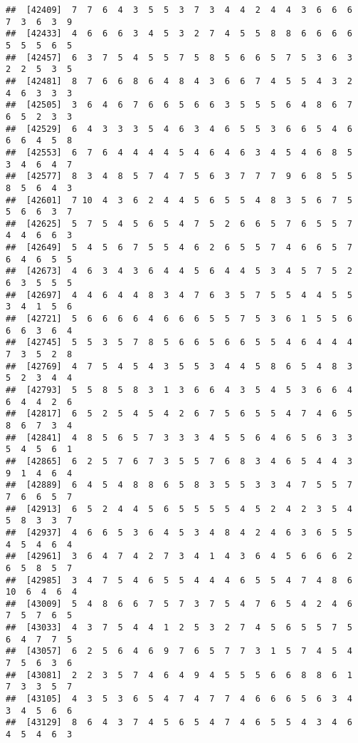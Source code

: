 \documentclass[
]{book}
\begin{document}
\begin{verbatim}
##  [42409]  7  7  6  4  3  5  5  3  7  3  4  4  2  4  4  3  6  6  6  7  3  6  3  9
##  [42433]  4  6  6  6  3  4  5  3  2  7  4  5  5  8  8  6  6  6  6  5  5  5  6  5
##  [42457]  6  3  7  5  4  5  5  7  5  8  5  6  6  5  7  5  3  6  3  2  2  5  3  5
##  [42481]  8  7  6  6  8  6  4  8  4  3  6  6  7  4  5  5  4  3  2  4  6  3  3  3
##  [42505]  3  6  4  6  7  6  6  5  6  6  3  5  5  5  6  4  8  6  7  6  5  2  3  3
##  [42529]  6  4  3  3  3  5  4  6  3  4  6  5  5  3  6  6  5  4  6  6  6  4  5  8
##  [42553]  6  7  6  4  4  4  4  5  4  6  4  6  3  4  5  4  6  8  5  3  4  6  4  7
##  [42577]  8  3  4  8  5  7  4  7  5  6  3  7  7  7  9  6  8  5  5  8  5  6  4  3
##  [42601]  7 10  4  3  6  2  4  4  5  6  5  5  4  8  3  5  6  7  5  5  6  6  3  7
##  [42625]  5  7  5  4  5  6  5  4  7  5  2  6  6  5  7  6  5  5  7  4  4  6  6  3
##  [42649]  5  4  5  6  7  5  5  4  6  2  6  5  5  7  4  6  6  5  7  6  4  6  5  5
##  [42673]  4  6  3  4  3  6  4  4  5  6  4  4  5  3  4  5  7  5  2  6  3  5  5  5
##  [42697]  4  4  6  4  4  8  3  4  7  6  3  5  7  5  5  4  4  5  5  3  4  1  5  6
##  [42721]  5  6  6  6  6  4  6  6  6  5  5  7  5  3  6  1  5  5  6  6  6  3  6  4
##  [42745]  5  5  3  5  7  8  5  6  6  5  6  6  5  5  4  6  4  4  4  7  3  5  2  8
##  [42769]  4  7  5  4  5  4  3  5  5  3  4  4  5  8  6  5  4  8  3  5  2  3  4  4
##  [42793]  5  5  8  5  8  3  1  3  6  6  4  3  5  4  5  3  6  6  4  6  4  4  2  6
##  [42817]  6  5  2  5  4  5  4  2  6  7  5  6  5  5  4  7  4  6  5  8  6  7  3  4
##  [42841]  4  8  5  6  5  7  3  3  3  4  5  5  6  4  6  5  6  3  3  5  4  5  6  1
##  [42865]  6  2  5  7  6  7  3  5  5  7  6  8  3  4  6  5  4  4  3  9  1  4  6  4
##  [42889]  6  4  5  4  8  8  6  5  8  3  5  5  3  3  4  7  5  5  7  7  6  6  5  7
##  [42913]  6  5  2  4  4  5  6  5  5  5  5  4  5  2  4  2  3  5  4  5  8  3  3  7
##  [42937]  4  6  6  5  3  6  4  5  3  4  8  4  2  4  6  3  6  5  5  4  5  4  6  4
##  [42961]  3  6  4  7  4  2  7  3  4  1  4  3  6  4  5  6  6  6  2  6  5  8  5  7
##  [42985]  3  4  7  5  4  6  5  5  4  4  4  6  5  5  4  7  4  8  6 10  6  4  6  4
##  [43009]  5  4  8  6  6  7  5  7  3  7  5  4  7  6  5  4  2  4  6  7  5  7  6  5
##  [43033]  4  3  7  5  4  4  1  2  5  3  2  7  4  5  6  5  5  7  5  6  4  7  7  5
##  [43057]  6  2  5  6  4  6  9  7  6  5  7  7  3  1  5  7  4  5  4  7  5  6  3  6
##  [43081]  2  2  3  5  7  4  6  4  9  4  5  5  5  6  6  8  8  6  1  7  3  3  5  7
##  [43105]  4  3  5  3  6  5  4  7  4  7  7  4  6  6  6  5  6  3  4  3  4  5  6  6
##  [43129]  8  6  4  3  7  4  5  6  5  4  7  4  6  5  5  4  3  4  6  4  5  4  6  3

\end{verbatim}
\end{document}
